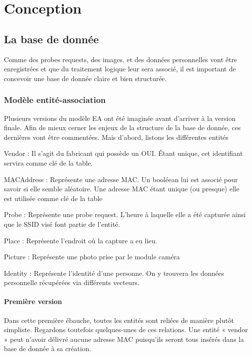 \chapter{Conception}
\label{ch:conception}

\section{La base de donnée}
\label{sec:database}
Comme des probes requests, des images, et des données personnelles vont être enregistrées et que du traitement
logique leur sera associé, il est important de concevoir une base de donnée claire et bien structurée.

\subsection{Modèle entité-association}
Plusieurs versions du modèle EA ont été imaginée avant d’arriver à la version finale. Afin de mieux cerner les enjeux
de la structure de la base de donnée, ces dernières vont être commentées. Mais d’abord, listons les différentes
entités

Vendor : Il s’agit du fabricant qui possède un OUI. Étant unique, cet identifiant servira comme clé de la table.

MACAddress : Représente une adresse MAC. Un booléean lui est associé pour savoir si elle semble aléatoire. Une
adresse MAC étant unique (ou presque) elle est utilisée comme clé de la table

Probe : Représente une probe request. L’heure à laquelle elle a été capturée ainsi que le SSID visé font partie de
l’entité.

Place : Représente l’endroit où la capture a eu lieu.

Picture : Représente une photo prise par le module caméra

Identity : Représente l’identité d’une personne. On y trouvera les données personnelle récupérées via différents
vecteurs.

\subsubsection{Première version}
Dans cette première ébauche, toutes les entités sont reliées de manière plutôt simpliste. Regardons toutefois
quelques-unes de ces relations.
Une entité « vendor » peut n’avoir délivré aucune adresse MAC puisqu’ils seront tous insérés dans la base de donnée
à sa création.

